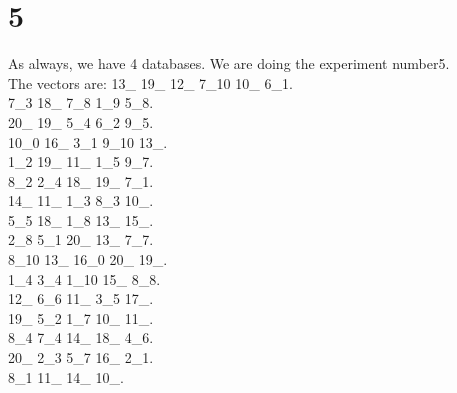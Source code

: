 \chapter{5}
\indent As always, we have 4 databases. We are doing the experiment number5.\\
The vectors are:
13\_ 19\_ 12\_ 7\_10 10\_ 6\_1.\\7\_3 18\_ 7\_8 1\_9 5\_8.\\20\_ 19\_ 5\_4 6\_2 9\_5.\\10\_0 16\_ 3\_1 9\_10 13\_.\\1\_2 19\_ 11\_ 1\_5 9\_7.\\8\_2 2\_4 18\_ 19\_ 7\_1.\\14\_ 11\_ 1\_3 8\_3 10\_.\\5\_5 18\_ 1\_8 13\_ 15\_.\\2\_8 5\_1 20\_ 13\_ 7\_7.\\8\_10 13\_ 16\_0 20\_ 19\_.\\1\_4 3\_4 1\_10 15\_ 8\_8.\\12\_ 6\_6 11\_ 3\_5 17\_.\\19\_ 5\_2 1\_7 10\_ 11\_.\\8\_4 7\_4 14\_ 18\_ 4\_6.\\20\_ 2\_3 5\_7 16\_ 2\_1.\\8\_1 11\_ 14\_ 10\_.\\